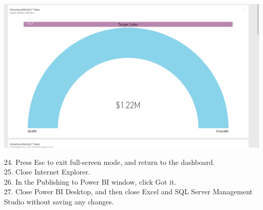 	\begin{center}
	\includegraphics[width=17cm]{./Imagenes/Ejercicio3/Tarea2/13}
	\end{center}	

24. Press Esc to exit full-screen mode, and return to the dashboard.\\
25. Close Internet Explorer.\\
26. In the Publishing to Power BI window, click Got it.\\
27. Close Power BI Desktop, and then close Excel and SQL Server Management Studio without saving any
changes.

